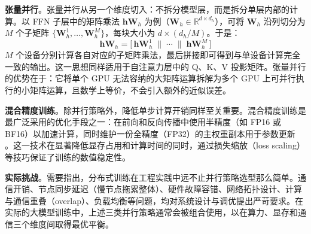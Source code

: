 \medskip
\noindent\textbf{张量并行}。张量并行从另一个维度切入：不拆分模型层，而是拆分单层内部的计算。以 FFN 子层中的矩阵乘法 $\mathbf{h} \mathbf{W}_h$ 为例（$\mathbf{W}_h \in \mathbb{R}^{d \times d_h}$），可将 $\mathbf{W}_h$ 沿列切分为 $M$ 个子矩阵 $\{\mathbf{W}_h^1,\dots,\mathbf{W}_h^M\}$，每块大小为 $d \times (d_h/M)$。于是：
\begin{equation}
  \mathbf{h} \mathbf{W}_h = \big[\,\mathbf{h} \mathbf{W}_h^1 \;\|\; \cdots \;\|\; \mathbf{h} \mathbf{W}_h^M \,\big]
\end{equation}
$M$ 个设备分别计算各自对应的子矩阵乘法，最后拼接即可得到与单设备计算完全一致的输出。这一思想同样适用于自注意力层中的 Q、K、V 投影矩阵。张量并行的优势在于：它将单个 GPU 无法容纳的大矩阵运算拆解为多个 GPU 上可并行执行的小矩阵运算，且数学上等价，不会引入额外的近似误差。

\medskip
\noindent\textbf{混合精度训练}。除并行策略外，降低单步计算开销同样至关重要。混合精度训练是最广泛采用的优化手段之一：在前向和反向传播中使用半精度（如 FP16 或 BF16）以加速计算，同时维护一份全精度（FP32）的主权重副本用于参数更新 \cite{micikevicius-etal:2018mixed}。这一技术在显著降低显存占用和计算时间的同时，通过损失缩放（loss scaling）等技巧保证了训练的数值稳定性。

\medskip
\noindent\textbf{实际挑战}。需要指出，分布式训练在工程实践中远不止并行策略选型那么简单。通信开销、节点同步延迟（慢节点拖累整体）、硬件故障容错、网络拓扑设计、计算与通信重叠（overlap）、负载均衡等问题，均对系统设计与调优提出严苛要求。在实际的大模型训练中，上述三类并行策略通常会被组合使用，以在算力、显存和通信三个维度间取得最优平衡。





